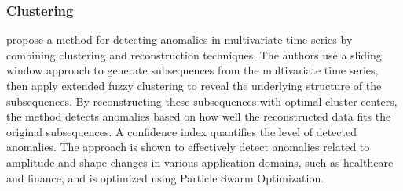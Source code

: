 \subsubsection{Clustering}
 propose a method for detecting anomalies in multivariate time series by combining clustering and reconstruction techniques. The authors use a sliding window approach to generate subsequences from the multivariate time series, then apply extended fuzzy clustering to reveal the underlying structure of the subsequences. By reconstructing these subsequences with optimal cluster centers, the method detects anomalies based on how well the reconstructed data fits the original subsequences. A confidence index quantifies the level of detected anomalies. The approach is shown to effectively detect anomalies related to amplitude and shape changes in various application domains, such as healthcare and finance, and is optimized using Particle Swarm Optimization.
